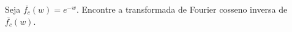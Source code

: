 \linespread{1.5}
Seja $\overline{f_c}(w) = e^{-w}$. Encontre a transformada de Fourier cosseno inversa de $\overline{f_c}(w)$.